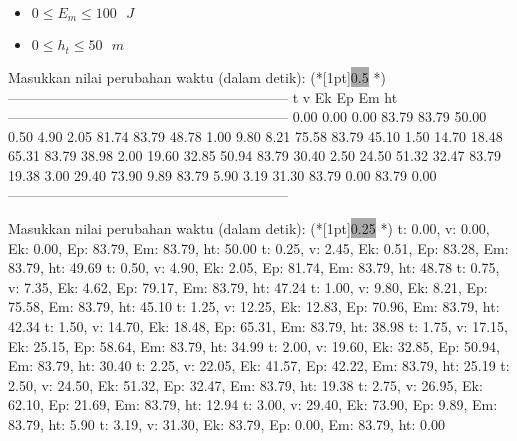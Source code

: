 \documentclass{article}
\newcommand{\enter}{\raisebox{-1.8pt}{\begin{tikzpicture}[scale=0.3]
    \draw[thin,fill=lightgray] (0,0) rectangle (2,1);
    \draw (0.3,0.3) -- (0.7,0.3)--(0.7,0.6);     
\end{tikzpicture}}}
\newcommand{\inputscan}[1]{\raisebox{0pt}[1pt]{\colorbox{darkgray}{#1}}}
\begin{document}
\begin{enumerate}[label=\textbf{\arabic*.}]
\begin{out}
\begin{itemize}
                \item $0\leq E_m\leq 100\text{ }J$
                \item $0\leq h_t\leq 50\text{ }m$
            \end{itemize}
        \end{out}
        \begin{RunCode}
            Masukkan nilai perubahan waktu (dalam detik): (*\inputscan{0.5} \enter*)
------------------------------------------------------------
t          v          Ek         Ep         Em         ht
------------------------------------------------------------
0.00       0.00       0.00       83.79      83.79      50.00
0.50       4.90       2.05       81.74      83.79      48.78
1.00       9.80       8.21       75.58      83.79      45.10
1.50       14.70      18.48      65.31      83.79      38.98     
2.00       19.60      32.85      50.94      83.79      30.40
2.50       24.50      51.32      32.47      83.79      19.38
3.00       29.40      73.90      9.89       83.79      5.90
3.19       31.30      83.79      0.00       83.79      0.00
------------------------------------------------------------
        \end{RunCode}
        \begin{RunCodeMore}
Masukkan nilai perubahan waktu (dalam detik): (*\inputscan{0.25} \enter*)
t: 0.00, v: 0.00, Ek: 0.00, Ep: 83.79, Em: 83.79, ht: 50.00
t: 0.25, v: 2.45, Ek: 0.51, Ep: 83.28, Em: 83.79, ht: 49.69
t: 0.50, v: 4.90, Ek: 2.05, Ep: 81.74, Em: 83.79, ht: 48.78
t: 0.75, v: 7.35, Ek: 4.62, Ep: 79.17, Em: 83.79, ht: 47.24
t: 1.00, v: 9.80, Ek: 8.21, Ep: 75.58, Em: 83.79, ht: 45.10
t: 1.25, v: 12.25, Ek: 12.83, Ep: 70.96, Em: 83.79, ht: 42.34
t: 1.50, v: 14.70, Ek: 18.48, Ep: 65.31, Em: 83.79, ht: 38.98
t: 1.75, v: 17.15, Ek: 25.15, Ep: 58.64, Em: 83.79, ht: 34.99
t: 2.00, v: 19.60, Ek: 32.85, Ep: 50.94, Em: 83.79, ht: 30.40
t: 2.25, v: 22.05, Ek: 41.57, Ep: 42.22, Em: 83.79, ht: 25.19
t: 2.50, v: 24.50, Ek: 51.32, Ep: 32.47, Em: 83.79, ht: 19.38
t: 2.75, v: 26.95, Ek: 62.10, Ep: 21.69, Em: 83.79, ht: 12.94
t: 3.00, v: 29.40, Ek: 73.90, Ep: 9.89, Em: 83.79, ht: 5.90
t: 3.19, v: 31.30, Ek: 83.79, Ep: 0.00, Em: 83.79, ht: 0.00
        \end{RunCodeMore}
    \end{enumerate}
\end{document}
